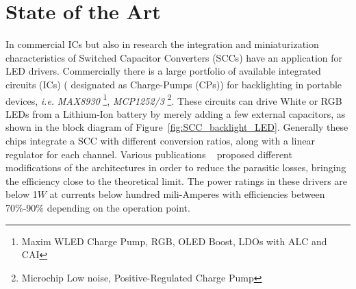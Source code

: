 \section{State of the Art}
In  commercial ICs but also in research the integration and miniaturization characteristics of Switched Capacitor Converters (SCCs) have an application for LED drivers. Commercially there is a large portfolio of available integrated circuits (ICs) ( designated as Charge-Pumps (CPs))  for backlighting in portable devices, \emph{i.e.}  \emph{MAX8930} \footnote{Maxim\textsuperscript{\textregistered} WLED Charge Pump, RGB, OLED Boost, LDOs with ALC and CAI }, \emph{MCP1252/3} \footnote{Microchip\textsuperscript{\textregistered} Low noise, Positive-Regulated Charge Pump}. These circuits can drive White or RGB LEDs from a Lithium-Ion battery by merely adding a few external capacitors,  as shown in the block diagram of Figure~\ref{fig:SCC_backlight_LED}. Generally these chips integrate a SCC with different conversion ratios, along with a linear regulator for each channel. Various publications ~\cite{07Feng,09Wu,10Yin} proposed different modifications of the architectures in order to reduce the parasitic losses, bringing the efficiency close to the theoretical limit. The power ratings in these drivers are below 1$W$ at currents below hundred mili-Amperes with efficiencies between 70\%-90\% depending on the operation point.

